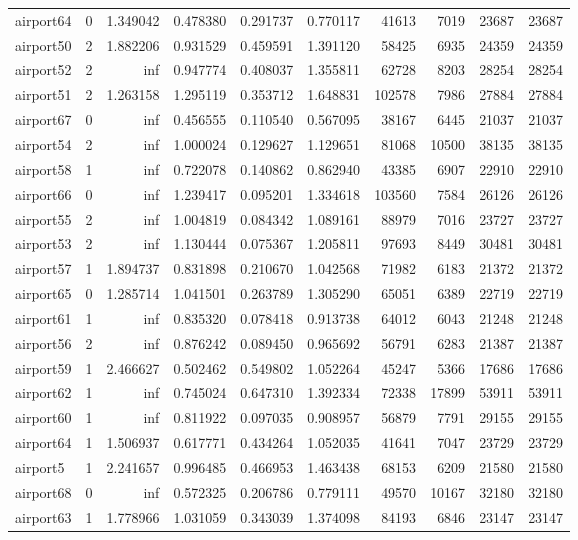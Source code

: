 \begin{longtable}{|l|r|r|r|r|r|r|r|r|r|}
airport64 & 0 & 1.349042 & 0.478380 & 0.291737 & 0.770117 & 41613 & 7019 & 23687 & 23687 \\
airport50 & 2 & 1.882206 & 0.931529 & 0.459591 & 1.391120 & 58425 & 6935 & 24359 & 24359 \\
airport52 & 2 & inf & 0.947774 & 0.408037 & 1.355811 & 62728 & 8203 & 28254 & 28254 \\
airport51 & 2 & 1.263158 & 1.295119 & 0.353712 & 1.648831 & 102578 & 7986 & 27884 & 27884 \\
airport67 & 0 & inf & 0.456555 & 0.110540 & 0.567095 & 38167 & 6445 & 21037 & 21037 \\
airport54 & 2 & inf & 1.000024 & 0.129627 & 1.129651 & 81068 & 10500 & 38135 & 38135 \\
airport58 & 1 & inf & 0.722078 & 0.140862 & 0.862940 & 43385 & 6907 & 22910 & 22910 \\
airport66 & 0 & inf & 1.239417 & 0.095201 & 1.334618 & 103560 & 7584 & 26126 & 26126 \\
airport55 & 2 & inf & 1.004819 & 0.084342 & 1.089161 & 88979 & 7016 & 23727 & 23727 \\
airport53 & 2 & inf & 1.130444 & 0.075367 & 1.205811 & 97693 & 8449 & 30481 & 30481 \\
airport57 & 1 & 1.894737 & 0.831898 & 0.210670 & 1.042568 & 71982 & 6183 & 21372 & 21372 \\
airport65 & 0 & 1.285714 & 1.041501 & 0.263789 & 1.305290 & 65051 & 6389 & 22719 & 22719 \\
airport61 & 1 & inf & 0.835320 & 0.078418 & 0.913738 & 64012 & 6043 & 21248 & 21248 \\
airport56 & 2 & inf & 0.876242 & 0.089450 & 0.965692 & 56791 & 6283 & 21387 & 21387 \\
airport59 & 1 & 2.466627 & 0.502462 & 0.549802 & 1.052264 & 45247 & 5366 & 17686 & 17686 \\
airport62 & 1 & inf & 0.745024 & 0.647310 & 1.392334 & 72338 & 17899 & 53911 & 53911 \\
airport60 & 1 & inf & 0.811922 & 0.097035 & 0.908957 & 56879 & 7791 & 29155 & 29155 \\
airport64 & 1 & 1.506937 & 0.617771 & 0.434264 & 1.052035 & 41641 & 7047 & 23729 & 23729 \\
airport5 & 1 & 2.241657 & 0.996485 & 0.466953 & 1.463438 & 68153 & 6209 & 21580 & 21580 \\
airport68 & 0 & inf & 0.572325 & 0.206786 & 0.779111 & 49570 & 10167 & 32180 & 32180 \\
airport63 & 1 & 1.778966 & 1.031059 & 0.343039 & 1.374098 & 84193 & 6846 & 23147 & 23147 \\

\end{longtable}
